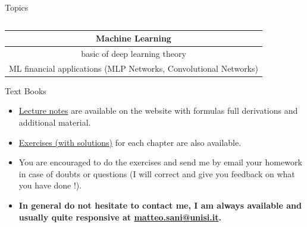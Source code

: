 \documentclass{beamer}
\begin{document}
\begin{frame}{Topics}
\begin{columns}
  \end{columns}
\vspace{0.5cm}
\begin{center}
    \begin{tabular}{|c|}
	\hline
	\textbf{Machine Learning}\\
	\hline\hline
	basic of deep learning theory\\
	\hline
	ML financial applications (MLP Networks, Convolutional Networks)\\
	\hline
\end{tabular}
\end{center}
\end{frame}

\begin{frame}{Text Books}
  \begin{itemize}
    \item \href{https://drive.google.com/file/d/1GnlyuB4KkUbzqL7tf6nju-ZEqnfQrRa4/view?usp=drive_link}{Lecture notes} are available on the website with formulas full derivations and additional material.
    \item \href{https://drive.google.com/file/d/1wrOj1xTehJvd4UCDCVl7WnUFST16IZJP/view?usp=drive_link}{Exercises (with solutions)} for each chapter are also available. 
    \item You are encouraged to do the exercises and send me by email your homework in case of doubts or questions (I will correct and give you feedback on what you have done !).
    \item \textbf{In general do not hesitate to contact me, I am always available and usually quite responsive at \href{mailto:matteo.sani@unisi.it}{matteo.sani@unisi.it}.}
  \end{itemize}
\end{frame}
\end{document}
